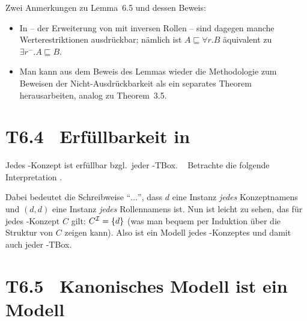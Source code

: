 \documentclass[fontsize=11pt, twoside=false, numbers=autoenddot]{scrbook}
\begin{document}
Zwei Anmerkungen zu Lemma~6.5 und dessen Beweis:
%
\begin{itemize}
  \item 
    In \ELI{} -- der Erweiterung von \EL mit inversen Rollen --
    sind dagegen manche Werterestriktionen ausdrückbar;
    nämlich ist $A \sqsubseteq \forall r.B$ äquivalent zu $\exists r^-.A \sqsubseteq B$.
  \item
    Man kann aus dem Beweis des Lemmas wieder die Methodologie
    zum Beweisen der Nicht-Ausdrückbarkeit als ein separates Theorem
    herausarbeiten, analog zu Theorem~3.5.
\end{itemize}


\section*{T6.4~ {\boldmath Erfüllbarkeit in \EL}}

Jedes \EL-Konzept ist erfüllbar bzgl.\ jeder \EL-TBox.
%
\parII
{}~
Betrachte die folgende Interpretation \Imc.
%
\begin{center}
\end{center}
%
Dabei bedeutet die Schreibweise "`$\dots$"', dass $d$ eine Instanz \emph{jedes} Konzeptnamens
und $(d,d)$ eine Instanz \emph{jedes} Rollennamens ist.
Nun ist leicht zu sehen, das für jedes \EL-Konzept $C$ gilt: $C^\mathcal{I} = \{d\}$
(was man bequem per Induktion über die Struktur von $C$ zeigen kann).
Also ist \Imc ein Modell jedes \EL-Konzeptes
und damit auch jeder \EL-TBox.
\qedhere

\section*{T6.5~ Kanonisches Modell ist ein Modell}
\end{document}
